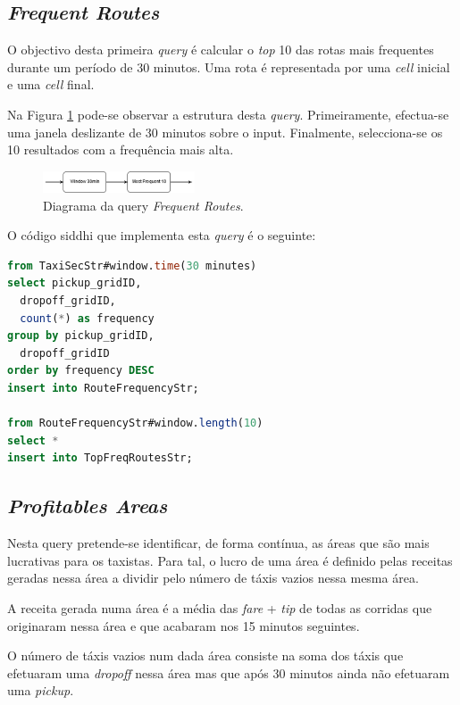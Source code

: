 \documentclass[article]{IEEEtran}
\begin{document}
\subsection{\textit{Frequent Routes}}

O objectivo desta primeira \textit{query} é calcular o \textit{top} 10 das rotas mais frequentes durante um período de 30 minutos. Uma rota é representada por uma \textit{cell} inicial e uma \textit{cell} final.

Na Figura \ref{fig:frequentRoutesDiagram} pode-se observar a estrutura desta \textit{query}. Primeiramente, efectua-se uma janela deslizante de 30 minutos sobre o input. Finalmente, selecciona-se os 10 resultados com a frequência mais alta.

\begin{figure}[hbtp]
    \centering
        \includegraphics[width=0.4\textwidth]{images/frequentRoutesDiagram}
    \caption{Diagrama da query \textit{Frequent Routes}.}
    \label{fig:frequentRoutesDiagram}
\end{figure}

O código siddhi que implementa esta \textit{query} é o seguinte:

\begin{lstlisting}[language=SQL]
from TaxiSecStr#window.time(30 minutes)
select pickup_gridID,
  dropoff_gridID,
  count(*) as frequency
group by pickup_gridID,
  dropoff_gridID
order by frequency DESC
insert into RouteFrequencyStr;

from RouteFrequencyStr#window.length(10)
select *
insert into TopFreqRoutesStr;
\end{lstlisting}

\subsection{\textit{Profitables Areas}}

Nesta query pretende-se identificar, de forma contínua, as áreas que são mais lucrativas para os taxistas. Para tal, o lucro de uma área é definido pelas receitas geradas nessa área a dividir pelo número de táxis vazios nessa mesma área.

A receita gerada numa área é a média das \textit{fare} + \textit{tip} de todas as corridas que originaram nessa área e que acabaram nos 15 minutos seguintes.

O número de táxis vazios num dada área consiste na soma dos táxis que efetuaram uma \textit{dropoff} nessa área mas que após 30 minutos ainda não efetuaram uma \textit{pickup}.
\end{document}
